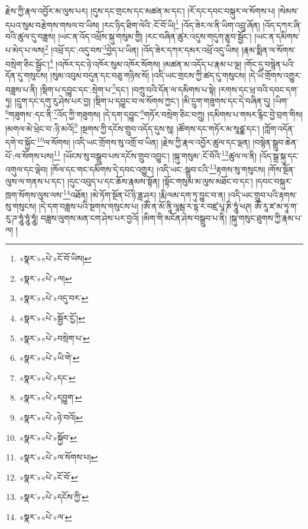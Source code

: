 རྗེས་ཀྱི་རྣལ་འབྱོར་མ་ལུས་པར། །དུས་དང་གྲངས་དང་མཚན་མ་དང་། །རོ་དང་དབང་བསྐུར་ལ་སོགས་པ། །སེམས་དཔའ་སུམ་བརྩེགས་གསལ་བ་ཡིས། །རང་ཉིད་ཐིག་ལེའི་:ངོ་བོ་ཡི།\footnote{«སྣར་»«པེ་»ངོ་བོ་ཡིས།} །འོད་ཟེར་ལ་ནི་ཡིག་འབྲུ་ཞོན། །འོད་དཀར་ཞི་བའི་ཚུལ་དུ་བཟླས། །ཡང་ན་འོད་འཕྲོས་སྐུ་གསུམ་གྱི། །རང་བཞིན་ཚུར་འདུས་གདུག་རྩུབ་སྦྱོང་། །ཡང་ན་དམིགས་པ་མེད་པ་ལས།\footnote{«སྣར་»«པེ་»ལ།} །འཕྲོ་དང་:འདུ་བས་\footnote{«སྣར་»«པེ་»འདུ་བར་}བྱེད་པ་ཡིན། །འོད་ཟེར་དཀར་དམར་འཕྲོ་འདུ་ཡིས། །རྣམ་སྨིན་ལ་སོགས་བསྲེག་ཅིང་སྦྱོང་།\footnote{«སྣར་»«པེ་»སྦྱོར་ྱོང་།} །འཁོར་དང་ཉེ་འཁོར་སུམ་འཁོར་སོགས། །མཚན་མ་འདོད་པ་རྣམ་པ་ལྔ། །གོང་དུ་བསྙེན་པའི་དོན་དུ་གསུངས། །སུམ་འབུམ་བདུན་དང་བཅུ་གཉིས་སོ། །འདི་ཡང་གྲངས་ཀྱི་ཚད་དུ་གསུངས། །དེ་ཡི་གྲོགས་འགྱུར་བཟླས་པ་ནི། །སྡིག་པ་དབྱུང་དང་:སྲེག་པ་\footnote{«སྣར་»«པེ་»བསྲེག་པ་}དང་། །བཀྲུ་བའི་དོན་ལ་དམིགས་པ་སྟེ། །རགས་དང་ཕྲ་བའི་དབང་དག་ཏུ། །དྲུག་དང་དགུ་རུ་ཤེས་པར་བྱ། །སྡིག་པ་དབྱུང་བ་ལ་སོགས་ཀྱང་། །མི་དྲུག་གཟུགས་དང་དེ་བཞིན་དུ། །ཡིག་\footnote{«སྣར་»«པེ་»ཡི་གེ་}གཟུགས་:དང་ནི་\footnote{«སྣར་»«པེ་»དང་}འོད་ཀྱི་གཟུགས། །དེ་དག་དབྱུང་\footnote{«སྣར་»«པེ་»དབྱུག་}གཏོར་བསྲེག་ཅིང་བཀྲུ། །དམིགས་པ་གསར་རྙིང་བྱེ་བྲག་གིས། །མགལ་མེ་ཕྲེང་བ་:ཉི་མའོ།\footnote{«སྣར་»«པེ་»ཉེ་བའོ།} །སྔགས་ཀྱི་དངོས་གྲུབ་འདོད་དུས་སུ། །ཚོགས་དང་གཏོར་མ་སཱཙྪ་དང་། །ཀློག་འདོན་དགེ་བ་སྐྱོང་\footnote{«སྣར་»«པེ་»སྐྱོབ་}ལ་སོགས། །འདི་ཡང་གྲོགས་སུ་འགྲོ་བ་ཡིན། །རྗེས་ཀྱི་རྣལ་འབྱོར་ཚུལ་དང་ལྡན། །བསྙེན་སྒྲུབ་ཆེན་པོ་:ལ་སོགས་པས།\footnote{«སྣར་»«པེ་»ལ་སོགས་པ།} །ཡོངས་སུ་བསྒྲུབ་པས་དངོས་གྲུབ་འབྱུང་། །སྐུ་གསུམ་:ངོ་བོའི་\footnote{«སྣར་»«པེ་»ངོ་བོ་}ཚུལ་ལ་ནི། །འོད་སྒྲ་སྐུ་དང་འགུལ་དང་ལྡེབ། །ཁོལ་དང་གང་དམིགས་དེ་དབང་འགྱུར། །འདི་ཡང་:སྒྲུབ་ངའི་\footnote{«སྣར་»«པེ་»དངོས་ཀྱི་}རྟགས་སུ་གསུངས། །གོས་སྔོན་ལུས་ལ་གནས་པ་དང་། །དུང་འབུད་པ་དང་ཆོས་རྣམས་སྟོན། །སྟོང་གསུམ་མ་ལུས་མཐོང་བ་དང་། །དབང་བསྐུར་ཁྲག་སོགས་ལུས་ལས་\footnote{«སྣར་»«པེ་»ལ་}འཐོན། །མེ་ཏོག་སྔོན་པོ་ཉི་ཟླ་ཤར། །རྨི་ལམ་དག་ཏུ་བྱུང་བ་ན། །འདི་ཡང་གྲུབ་པའི་རྟགས་སུ་གསུངས། །དེ་དག་བཟླས་པའི་སྔགས་གསུངས་པ། །ཨོཾ་ན་མོ་ནཱི་ལཱམྦ་ར་དྷ་ར་བཛྲ་པཱ་ཎི་ཧཱུཾ་ཕཊ། ཨོཾ་རཱ་ཛ་མ་ཧཱ་ག་རུ་ཌ་ཧཱུཾ་ཧཱུཾ་ཧཱུཾ། བཟླས་ལུགས་མན་ངག་ཤེས་པར་བྱའོ། །མིག་གི་མངོན་ཤེས་བསྒྲུབ་པ་ནི། །སྐུ་གསུང་ཐུགས་ཀྱི་རྣམ་པ་ལ། །

